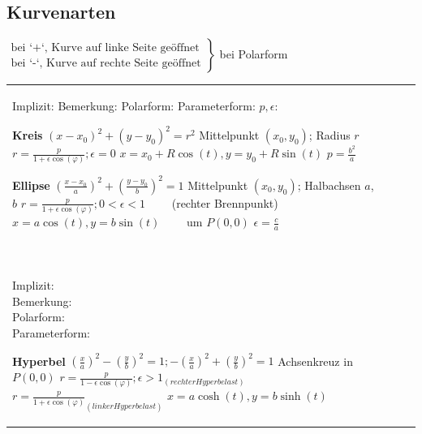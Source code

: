\subsection{Kurvenarten}
$ \left.\begin{matrix}
	\text{bei `+`, Kurve auf linke Seite geöffnet}\\ 
	\text{bei `-`, Kurve auf rechte Seite geöffnet}
\end{matrix}\right\rbrace $ 
bei Polarform

\begin{tabular}{llll}
\parbox{2.7cm}{
\textbf{ } \\
Implizit:\\
Bemerkung:\\
Polarform:\\
Parameterform:\\
$p, \epsilon$:
}

\parbox{6cm}{
\textbf{Kreis}\\
$(x-x_0)^2 + (y - y_0)^2 = r^2$\\
Mittelpunkt $(x_0, y_0)$; Radius $r$\\
$r = \frac{p}{1 + \epsilon \cos(\varphi)}; \epsilon = 0$\\
$x=x_0 + R\cos(t), y=y_0 + R\sin(t) $ \\
$ p = \frac{b^2}{a}$
} 

\parbox{8cm}{
\textbf{Ellipse}\\
$(\frac{x-x_0}{a})^2 + (\frac{y-y_0}{b})^2 = 1$\\
Mittelpunkt $(x_0, y_0)$; Halbachsen $a$, $b$\\
$r = \frac{p}{1 + \epsilon \cos(\varphi)}; 0 < \epsilon < 1 \qquad$ (rechter Brennpunkt)\\
$x = a\cos(t), y = b\sin(t) \qquad$ um $P(0,0)$ \\
$\epsilon = \frac{c}{a}$
}\\ \\


\parbox{2.7cm}{
\textbf {}\\
Implizit:\\
Bemerkung:\\
Polarform:\\
Parameterform:
}

\parbox{6cm}{
\textbf{Hyperbel}\\ 
$(\frac{x}{a})^2 - (\frac{y}{b})^2 = 1; -(\frac{x}{a})^2 + (\frac{y}{b})^2 =1$\\ 
Achsenkreuz in $P(0,0)$\\
$r = \frac{p}{1 - \epsilon \cos(\varphi)}; \epsilon > 1_{(rechter Hyperbelast)}$\\
$r = \frac{p}{1 + \epsilon \cos(\varphi)}_{(linker Hyperbelast)}$ \\
$x= a \cosh(t), y = b \sinh(t) $ 

}
\end{tabular}
